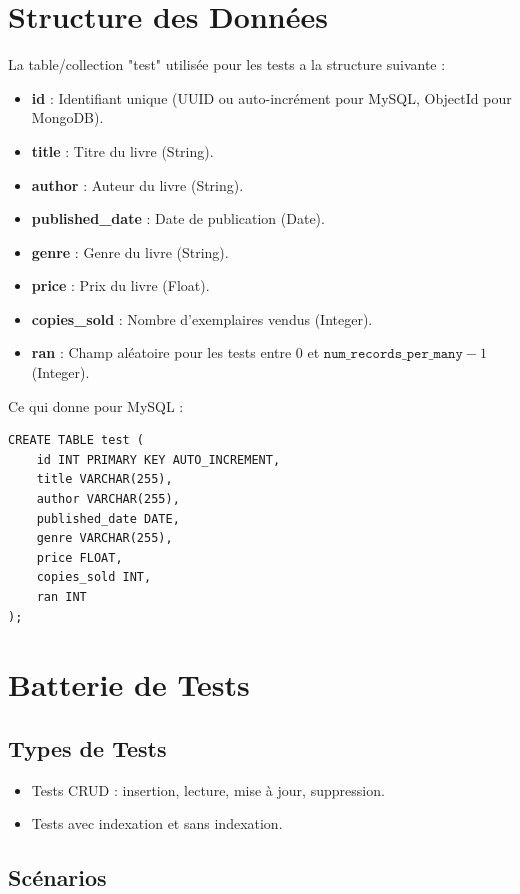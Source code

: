 \documentclass[a4paper,12pt]{report}
\begin{document}
\chapter{Structure des Données}
La table/collection "test" utilisée pour les tests a la structure suivante :
\begin{itemize}
    \item \textbf{id} : Identifiant unique (UUID ou auto-incrément pour MySQL, ObjectId pour MongoDB).
    \item \textbf{title} : Titre du livre (String).
    \item \textbf{author} : Auteur du livre (String).
    \item \textbf{published\_date} : Date de publication (Date).
    \item \textbf{genre} : Genre du livre (String).
    \item \textbf{price} : Prix du livre (Float).
    \item \textbf{copies\_sold} : Nombre d'exemplaires vendus (Integer).
    \item \textbf{ran} : Champ aléatoire pour les tests entre 0 et $\texttt{num\_records\_per\_many} - 1$ (Integer).
\end{itemize}
Ce qui donne pour MySQL :
\begin{verbatim}
CREATE TABLE test (
	id INT PRIMARY KEY AUTO_INCREMENT,
	title VARCHAR(255),
	author VARCHAR(255),
	published_date DATE,
	genre VARCHAR(255),
	price FLOAT,
	copies_sold INT,
	ran INT
);
\end{verbatim}

\chapter{Batterie de Tests}

\section{Types de Tests}

\begin{itemize}
    \item Tests CRUD : insertion, lecture, mise à jour, suppression.
    \item Tests avec indexation et sans indexation.
\end{itemize}

\section{Scénarios}
\end{document}
